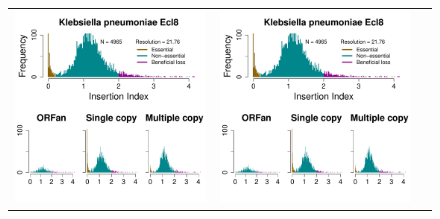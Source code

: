 \documentclass[a4paper,10pt, twocolumn]{article}
\begin{document}
\begin{figure}
\begin{tabular}{c c c}
\includegraphics[page=5, scale=0.28]{per-species-insertion-index.pdf} &
\includegraphics[page=6, scale=0.28]{per-species-insertion-index.pdf} \\

\end{tabular}
\end{figure}
\end{document}
